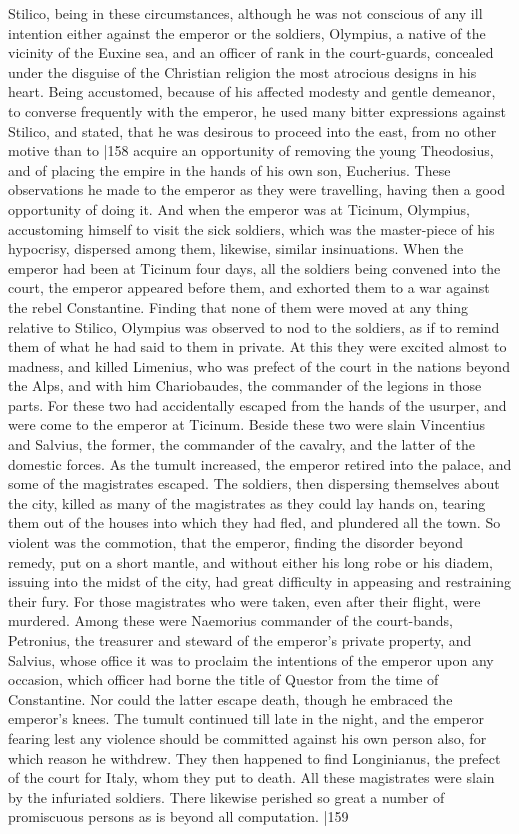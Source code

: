 Stilico, being in these circumstances, although he was not conscious of any ill intention either against the emperor or the soldiers, Olympius, a native of the vicinity of the Euxine sea, and an officer of rank in the court-guards, concealed under the disguise of the Christian religion the most atrocious designs in his heart. Being accustomed, because of his affected modesty and gentle demeanor, to converse frequently with the emperor, he used many bitter expressions against Stilico, and stated, that he was desirous to proceed into the east, from no other motive than to
|158 acquire an opportunity of removing the young Theodosius, and of placing the empire in the hands of his own son, Eucherius. These observations he made to the emperor as they were travelling, having then a good opportunity of doing it. And when the emperor was at Ticinum, Olympius, accustoming himself to visit the sick soldiers, which was the master-piece of his hypocrisy, dispersed among them, likewise, similar insinuations. When the emperor had been at Ticinum four days, all the soldiers being convened into the court, the emperor appeared before them, and exhorted them to a war against the rebel Constantine. Finding that none of them were moved at any thing relative to Stilico, Olympius was observed to nod to the soldiers, as if to remind them of what he had said to them in private. At this they were excited almost to madness, and killed Limenius, who was prefect of the court in the nations beyond the Alps, and with him Chariobaudes, the commander of the legions in those parts. For these two had accidentally escaped from the hands of the usurper, and were come to the emperor at Ticinum. Beside these two were slain Vincentius and Salvius, the former, the commander of the cavalry, and the latter of the domestic forces. As the tumult increased, the emperor retired into the palace, and some of the magistrates escaped. The soldiers, then dispersing themselves about the city, killed as many of the magistrates as they could lay hands on, tearing them out of the houses into which they had fled, and plundered all the town. So violent was the commotion, that the emperor, finding the disorder beyond remedy, put on a short mantle, and without either his long robe or his diadem, issuing into the midst of the city, had great difficulty in appeasing and restraining their fury. For those magistrates who were taken, even after their flight, were murdered. Among these were Naemorius commander of the court-bands, Petronius, the treasurer and steward of the emperor's private property, and Salvius, whose office it was to proclaim the intentions of the emperor upon any occasion, which officer had borne the title of Questor from the time of Constantine. Nor could the latter escape death, though he embraced the emperor's knees. The tumult continued till late in the night, and the emperor fearing lest any violence should be committed against his own person also, for which reason he withdrew. They then happened to find Longinianus, the prefect of the court for Italy, whom they put to death. All these magistrates were slain by the infuriated soldiers. There likewise perished so great a number of promiscuous persons as is beyond all computation.
|159

